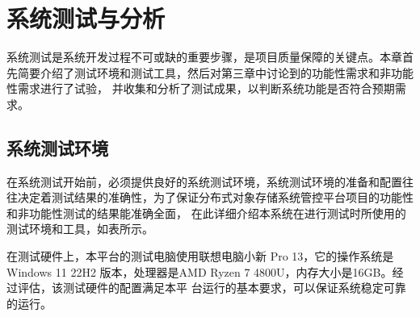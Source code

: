 \renewcommand{\arraystretch}{1.5}
\chapter{系统测试与分析}

系统测试是系统开发过程不可或缺的重要步骤，是项目质量保障的关键点。本章首先简要介绍了测试环境和测试工具，然后对第三章中讨论到的功能性需求和非功能性需求进行了试验，
并收集和分析了测试成果，以判断系统功能是否符合预期需求。

\section{系统测试环境}

在系统测试开始前，必须提供良好的系统测试环境，系统测试环境的准备和配置往往决定着测试结果的准确性，为了保证分布式对象存储系统管控平台项目的功能性和非功能性测试的结果能准确全面，
在此详细介绍本系统在进行测试时所使用的测试环境和工具，如表所示。

\begin{center}
    \renewcommand\arraystretch{1.5}{
    }
\end{center}

在测试硬件上，本平台的测试电脑使用联想电脑小新 Pro 13，它的操作系统是Windows 11 22H2 版本，处理器是AMD Ryzen 7 4800U，内存大小是16GB。经过评估，该测试硬件的配置满足本平
台运行的基本要求，可以保证系统稳定可靠的运行。

